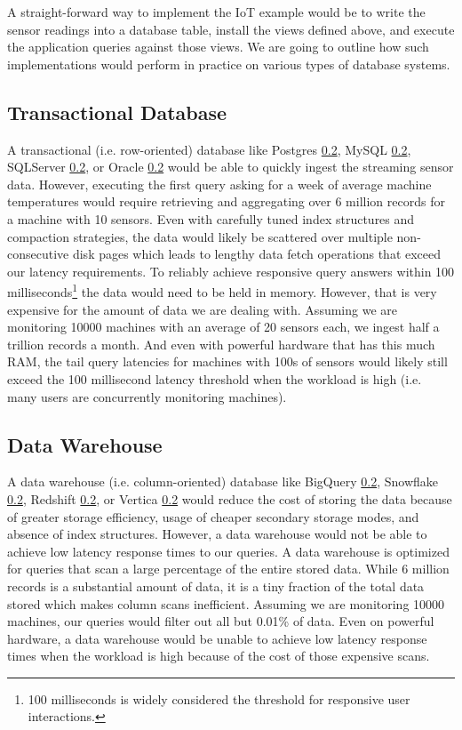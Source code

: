 \documentclass[	DIV=calc,%
							paper=letter,%
							fontsize=11pt,%
							twocolumn]{scrartcl}	 					%
\begin{document}
A straight-forward way to implement the IoT example would be to write the sensor readings into a database table, install the views defined above, and execute the application queries against those views. We are going to outline how such implementations would perform in practice on various types of database systems.

\subsection{Transactional Database}

A transactional (i.e. row-oriented) database like Postgres \ref{}, MySQL \ref{}, SQLServer \ref{}, or Oracle \ref{} would be able to quickly ingest the streaming sensor data. However, executing the first query asking for a week of average machine temperatures would require retrieving and aggregating over 6 million records for a machine with 10 sensors. Even with carefully tuned index structures and compaction strategies, the data would likely be scattered over multiple non-consecutive disk pages which leads to lengthy data fetch operations that exceed our latency requirements. To reliably achieve responsive query answers within 100 milliseconds\footnote{100 milliseconds is widely considered the threshold for responsive user interactions.} the data would need to be held in memory. However, that is very expensive for the amount of data we are dealing with. Assuming we are monitoring 10000 machines with an average of 20 sensors each, we ingest half a trillion records a month. And even with powerful hardware that has this much RAM, the tail query latencies for machines with 100s of sensors would likely still exceed the 100 millisecond latency threshold when the workload is high (i.e. many users are concurrently monitoring machines).

\subsection{Data Warehouse}

A data warehouse (i.e. column-oriented) database like BigQuery \ref{}, Snowflake \ref{}, Redshift \ref{}, or Vertica \ref{} would reduce the cost of storing the data because of greater storage efficiency, usage of cheaper secondary storage modes, and absence of index structures. However, a data warehouse would not be able to achieve low latency response times to our queries. A data warehouse is optimized for queries that scan a large percentage of the entire stored data. While 6 million records is a substantial amount of data, it is a tiny fraction of the total data stored which makes column scans inefficient. Assuming we are monitoring 10000 machines, our queries would filter out all but 0.01\% of data. Even on powerful hardware, a data warehouse would be unable to achieve low latency response times when the workload is high because of the cost of those expensive scans.
\end{document}
